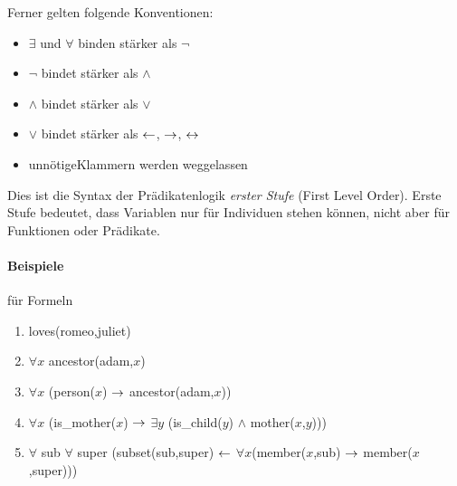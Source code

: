 \documentclass[a4paper,twoside,DIV15,BCOR12mm]{scrbook}
\begin{document}
Ferner gelten folgende Konventionen:
\begin{itemize}
\item $\exists$ und $\forall$ binden stärker als $\neg$
\item $\neg$ bindet stärker als $\wedge$
\item $\wedge$ bindet stärker als $\vee$
\item $\vee$ bindet stärker als $\leftarrow$, $\rightarrow$, $\leftrightarrow$
\item \glqq unnötige\grqq Klammern werden weggelassen
\end{itemize}

Dies ist die Syntax der Prädikatenlogik \emph{erster Stufe} (First Level Order). Erste Stufe bedeutet, dass Variablen nur für Individuen stehen können, nicht aber für Funktionen oder Prädikate.

\paragraph{Beispiele} für Formeln
\begin{enumerate}
\item  loves(romeo,juliet)
\item $\forall x$ ancestor(adam,$x$)
\item $\forall x$ (person($x$) $\rightarrow$ ancestor(adam,$x$))
\item $\forall x$ (is\_mother($x$) $\rightarrow$ $\exists y$ (is\_child($y$) $\wedge$ mother($x$,$y$)))
\item $\forall$ sub $\forall$ super (subset(sub,super) $\leftarrow$ $\forall x$(member($x$,sub) $\rightarrow$ member($x$,super)))
\end{enumerate}
\end{document}
